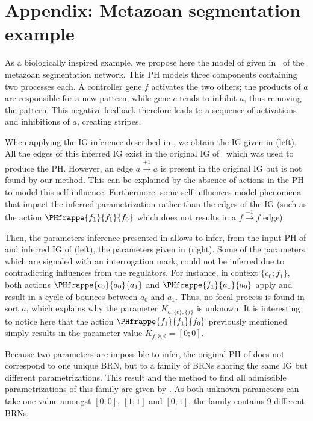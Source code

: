 \newpage

\appendix

\section*{Appendix: \quad Metazoan segmentation example}

As a biologically inspired example, we propose here the model of  given in~\cite{PMR10-TCSB} of the metazoan segmentation network.
This PH models three components containing two processes each.
A controller gene $f$ activates the two others;
the products of $a$ are responsible for a new pattern, while gene $c$ tends to inhibit $a$, thus removing the pattern.
This negative feedback therefore leads to a sequence of activations and inhibitions of $a$, creating stripes.

When applying the IG inference described in , we obtain the IG given in (left).
All the edges of this inferred IG exist in the original IG of~\cite{PMR10-TCSB} which was used to produce the PH.
However, an edge $a \xrightarrow{+1} a$ is present in the original IG but is not found by our method.
This can be explained by the absence of actions in the PH to model this self-influence.
Furthermore, some self-influences model phenomena that impact the inferred parametrization rather than the edges of the IG
(such as the action $\PHfrappe{f_1}{f_1}{f_0}$ which does not results in a $f \xrightarrow{-1} f$ edge).

Then, the parameters inference presented in  allows to infer, from the input PH of  and inferred IG of (left), the parameters given in (right).
Some of the parameters, which are signaled with an interrogation mark, could not be inferred due to contradicting influences from the regulators.
For instance, in context $\{c_0;f_1\}$, both actions $\PHfrappe{c_0}{a_0}{a_1}$ and $\PHfrappe{f_1}{a_1}{a_0}$ apply and result in a cycle of bounces between $a_0$ and $a_1$.
Thus, no focal process is found in sort $a$, which explains why the parameter $K_{a,\{c\},\{f\}}$ is unknown.
It is interesting to notice here that the action $\PHfrappe{f_1}{f_1}{f_0}$ previously mentioned simply results in the parameter value $K_{f,\emptyset,\emptyset} = [0;0]$.

Because two parameters are impossible to infer, the original PH of  does not correspond to one unique BRN, but to a family of BRNs sharing the same IG but different parametrizations.
This result and the method to find all admissible parametrizations of this family are given by .
As both unknown parameters can take one value amongst $[0;0]$, $[1;1]$ and $[0;1]$, the family contains 9 different BRNs.

